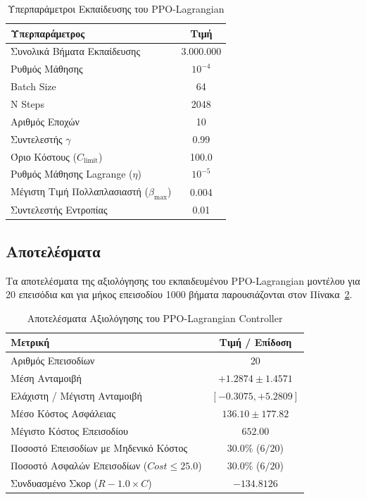 \documentclass[acmsmall,screen,nonacm]{acmart}
\begin{document}
	\begin{table}[H]
		\centering
		\begin{tabular}{lc}
			\toprule
			\textbf{Υπερπαράμετρος} & \textbf{Τιμή} \\
			\midrule
			Συνολικά Βήματα Εκπαίδευσης & 3.000.000 \\
			Ρυθμός Μάθησης & $10^{-4}$ \\
			Batch Size & 64 \\
			N Steps & 2048 \\
			Αριθμός Εποχών & 10 \\
			Συντελεστής $\gamma$ & 0.99 \\
			Όριο Κόστους ($C_{\text{limit}}$) & 100.0 \\
			Ρυθμός Μάθησης Lagrange ($\eta$) & $10^{-5}$ \\
			Μέγιστη Τιμή Πολλαπλασιαστή ($\beta_{\text{max}}$) & 0.004 \\
			Συντελεστής Εντροπίας & 0.01 \\
			\bottomrule
		\end{tabular}
		\caption{Υπερπαράμετροι Εκπαίδευσης του PPO-Lagrangian}
		\label{tab:ppo_lagrangian_hyperparams}
	\end{table}

	

	\subsection{Αποτελέσματα}
	Τα αποτελέσματα της αξιολόγησης του εκπαιδευμένου PPO-Lagrangian μοντέλου για 20 επεισόδια και για μήκος επεισοδίου 1000 βήματα παρουσιάζονται στον Πίνακα~\ref{tab:ppo_lagrangian_results}.

	\begin{table}[H]
		\centering
		\begin{tabular}{lc}
			\toprule
			\textbf{Μετρική} & \textbf{Τιμή / Επίδοση} \\
			\midrule
			Αριθμός Επεισοδίων & 20 \\
			Μέση Ανταμοιβή  & $+1.2874 \pm 1.4571$ \\
			Ελάχιστη / Μέγιστη Ανταμοιβή & $[-0.3075, +5.2809]$ \\
			Μέσο Κόστος Ασφάλειας & $136.10 \pm 177.82$ \\
			Μέγιστο Κόστος Επεισοδίου & $652.00$ \\
			Ποσοστό Επεισοδίων με Μηδενικό Κόστος & $30.0\%$ ($6/20$) \\
			Ποσοστό Ασφαλών Επεισοδίων ($Cost \le 25.0$) & $30.0\%$ ($6/20$) \\
			Συνδυασμένο Σκορ ($R - 1.0 \times C$) & $-134.8126$ \\
			\bottomrule
		\end{tabular}
		\caption{Αποτελέσματα Αξιολόγησης του PPO-Lagrangian Controller}
		\label{tab:ppo_lagrangian_results}
	\end{table}
\end{document}
